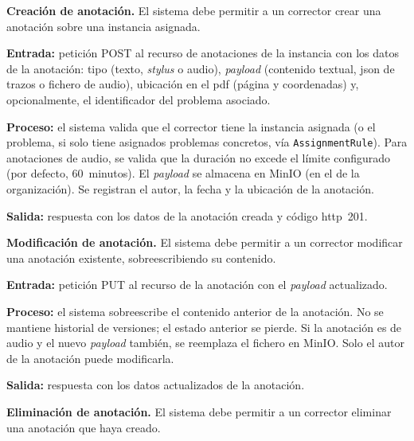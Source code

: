 \begin{functional}

    \item \textbf{Creación de anotación.} \label{rf:annotations:create}
    El sistema debe permitir a un corrector crear una anotación sobre una instancia
    asignada.

    \textbf{Entrada:} petición POST al recurso de anotaciones de la instancia con los datos
    de la anotación: tipo (texto, \textit{stylus} o audio), \textit{payload} (contenido
    textual, \acs{json} de trazos o fichero de audio), ubicación en el \acs{pdf} (página y
    coordenadas) y, opcionalmente, el identificador del problema asociado.

    \textbf{Proceso:} el sistema valida que el corrector tiene la instancia asignada (o el
    problema, si solo tiene asignados problemas concretos, vía \texttt{AssignmentRule}).
    Para anotaciones de audio, se valida que la duración no excede el límite configurado
    (por defecto, 60~minutos). El \textit{payload} se almacena en MinIO (en el
     de la organización). Se registran el autor, la fecha y la ubicación de la
    anotación.

    \textbf{Salida:} respuesta con los datos de la anotación creada y código
    \acs{http}~201.

    \item \textbf{Modificación de anotación.} \label{rf:annotations:update}
    El sistema debe permitir a un corrector modificar una anotación existente,
    sobreescribiendo su contenido.

    \textbf{Entrada:} petición PUT al recurso de la anotación con el \textit{payload}
    actualizado.

    \textbf{Proceso:} el sistema sobreescribe el contenido anterior de la anotación. No se
    mantiene historial de versiones; el estado anterior se pierde. Si la anotación es de
    audio y el nuevo \textit{payload} también, se reemplaza el fichero en MinIO. Solo el
    autor de la anotación puede modificarla.

    \textbf{Salida:} respuesta con los datos actualizados de la anotación.

    \item \textbf{Eliminación de anotación.} \label{rf:annotations:delete}
    El sistema debe permitir a un corrector eliminar una anotación que haya creado.


\end{functional}
